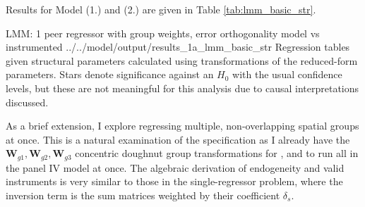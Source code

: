 \noindent
Results for Model (1.) and (2.) are given in Table \ref{tab:lmm_basic_str}.

\wraptable
        {LMM: 1 peer regressor with group weights, error orthogonality model vs instrumented}
        {../../model/output/results_1a_lmm_basic_str}
        {
            Regression tables given structural parameters
            calculated using transformations of the
            reduced-form parameters.
            Stars denote significance against an $H_0$
            with the usual confidence levels,
            but these are not meaningful for this analysis
            due to causal interpretations discussed.
        }

As a brief extension, I explore regressing multiple, non-overlapping spatial groups at once.
This is a natural examination of the specification as
I already have the $\mathbf W_{g1}, \mathbf W_{g2}, \mathbf W_{g3}$ concentric doughnut group transformations
for ,  and  to run all in the panel IV model at once.
The algebraic derivation of endogeneity and valid instruments
is very similar to those in the single-regressor problem,
where the inversion term is the sum matrices weighted by their coefficient $\delta_s$.

